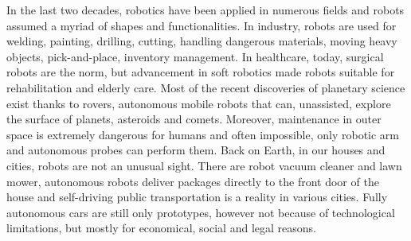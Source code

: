 In the last two decades, robotics have been applied in numerous fields and robots assumed a myriad of shapes and functionalities. In industry, robots are used for welding, painting, drilling, cutting, handling dangerous materials, moving heavy objects, pick-and-place, inventory management. In healthcare, today, surgical robots are the norm, but advancement in soft robotics made robots suitable for rehabilitation and elderly care. Most of the recent discoveries of planetary science exist thanks to rovers, autonomous mobile robots that can, unassisted, explore the surface of planets, asteroids and comets. Moreover, maintenance in outer space is extremely dangerous for humans and often impossible, only robotic arm and autonomous probes can perform them. Back on Earth, in our houses and cities, robots are not an unusual sight. There are robot vacuum cleaner and lawn mower,  autonomous robots deliver packages directly to the front door of the house and self-driving public transportation is a reality in various cities. Fully autonomous cars are still only prototypes, however not because of technological limitations, but mostly for economical, social and legal reasons. 
